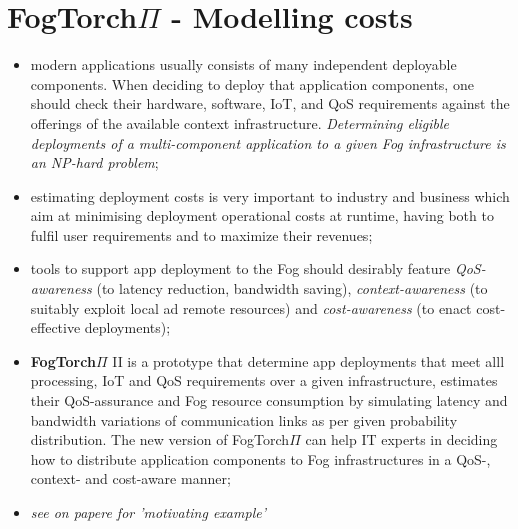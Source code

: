 \documentclass[oneside]{article}
\begin{document}
\section{FogTorch$\Pi$ - Modelling costs}
\begin{itemize}
    \item modern applications usually consists of many independent deployable components. When deciding to deploy that application components, one should check their hardware, software, IoT, and QoS requirements against the offerings of the available context infrastructure. \textit{Determining eligible deployments of a multi-component application to a given Fog infrastructure is an NP-hard problem};
    
    \item estimating deployment costs is very important to industry and business which aim at minimising deployment operational costs at runtime, having both to fulfil user requirements and to maximize their revenues;
    
    \item tools to support app deployment to the Fog should desirably feature \textit{QoS-awareness} (to latency reduction, bandwidth saving), \textit{context-awareness} (to suitably exploit local ad remote resources) and \textit{cost-awareness} (to enact cost-effective deployments);
    
    \item \textbf{FogTorch$\Pi$} II is a prototype that determine app deployments that meet alll processing, IoT and QoS requirements over a given infrastructure, estimates their QoS-assurance and Fog resource consumption by simulating latency and bandwidth variations of communication links as per given probability distribution. The new version of FogTorch$\Pi$ can help IT experts in deciding how to distribute application components to Fog infrastructures in a QoS-, context- and cost-aware manner;
    
    \item \textit{see on papere for 'motivating example'}
    \begin{figure}[!htb]
    \end{figure}
    

\end{itemize}
\end{document}
